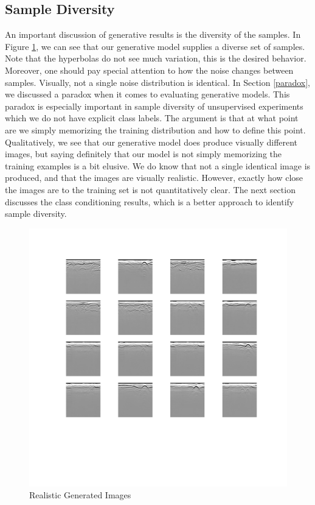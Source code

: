 \subsection{Sample Diversity}\label{sample diversity}
An important discussion of generative results is the diversity of the samples. In Figure \ref{fig:real_diversity}, we can see that our generative model supplies a diverse set of samples. Note that the hyperbolas do not see much variation, this is the desired behavior. Moreover, one should pay special attention to how the noise changes between samples. Visually, not a single noise distribution is identical. In Section \ref{paradox}, we discussed a paradox when it comes to evaluating generative models. This paradox is especially important in sample diversity of unsupervised experiments which we do not have explicit class labels. The argument is that at what point are we simply memorizing the training distribution and how to define this point. Qualitatively, we see that our generative model does produce visually different images, but saying definitely that our model is not simply memorizing the training examples is a bit elusive. We do know that not a single identical image is produced, and that the images are visually realistic. However, exactly how close the images are to the training set is not quantitatively clear. The next section discusses the class conditioning results, which is a better approach to identify sample diversity. 

\begin{figure}[H]
    \centering
    \includegraphics[width=\linewidth]{figures/diversity_512.png}
    \caption{Realistic Generated Images}
    \label{fig:real_diversity}
\end{figure}


